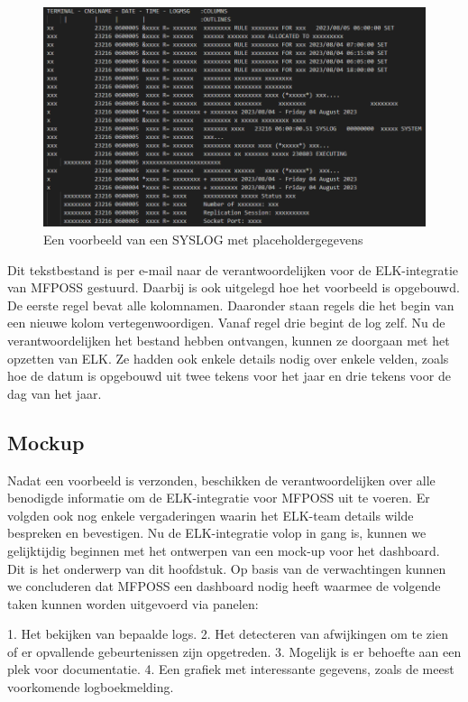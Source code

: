 \begin{figure}[h]
    \centering
    \includegraphics[width=1\linewidth]{bachproef/graphics/Voorbeeld_Syslog.png}
    \caption{Een voorbeeld van een SYSLOG met placeholdergegevens}
    \label{fig:Een voorbeeld van een SYSLOG met placeholdergegevens}
\end{figure}

Dit tekstbestand is per e-mail naar de verantwoordelijken voor de ELK-integratie van MFPOSS gestuurd. Daarbij is ook uitgelegd hoe het voorbeeld is opgebouwd. De eerste regel bevat alle kolomnamen. Daaronder staan regels die het begin van een nieuwe kolom vertegenwoordigen. Vanaf regel drie begint de log zelf. Nu de verantwoordelijken het bestand hebben ontvangen, kunnen ze doorgaan met het opzetten van ELK. Ze hadden ook enkele details nodig over enkele velden, zoals hoe de datum is opgebouwd uit twee tekens voor het jaar en drie tekens voor de dag van het jaar.

\subsection{Mockup}
Nadat een voorbeeld is verzonden, beschikken de verantwoordelijken over alle benodigde informatie om de ELK-integratie voor MFPOSS uit te voeren. Er volgden ook nog enkele vergaderingen waarin het ELK-team details wilde bespreken en bevestigen. Nu de ELK-integratie volop in gang is, kunnen we gelijktijdig beginnen met het ontwerpen van een mock-up voor het dashboard. Dit is het onderwerp van dit hoofdstuk. Op basis van de verwachtingen kunnen we concluderen dat MFPOSS een dashboard nodig heeft waarmee de volgende taken kunnen worden uitgevoerd via panelen:

1. Het bekijken van bepaalde logs.
2. Het detecteren van afwijkingen om te zien of er opvallende gebeurtenissen zijn opgetreden.
3. Mogelijk is er behoefte aan een plek voor documentatie.
4. Een grafiek met interessante gegevens, zoals de meest voorkomende logboekmelding.

